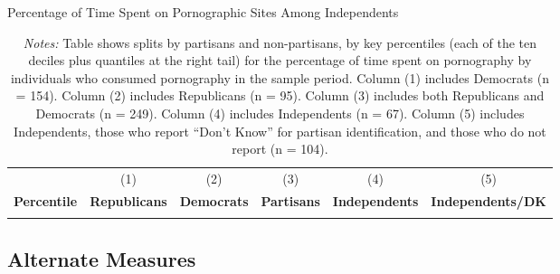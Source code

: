 \documentclass[12pt, letterpaper]{article}
\begin{document}
\begin{table}[ht] \centering \small \setlength\tabcolsep{6 pt}
	\caption{Percentage of Time Spent on Pornographic Sites Among Independents}
	\label{tab:percentiles_prop_duration_adultsites_by_individuals_independents_partisans}
	\begin{adjustbox}{max width=\textwidth}
		\begin{tabular}{@{\hspace{0\tabcolsep}}crrrrr@{\hspace{0\tabcolsep}}}
			\toprule		
			&\multicolumn{1}{c}{(1)}&\multicolumn{1}{c}{(2)}&\multicolumn{1}{c}{(3)}&\multicolumn{1}{c}{(4)}&\multicolumn{1}{c}{(5)}\\	
			\multicolumn{1}{l}{\textbf{Percentile}}&\multicolumn{1}{c}{\textbf{Republicans}}&\multicolumn{1}{c}{\textbf{Democrats}}&\multicolumn{1}{c}{\textbf{Partisans}}&\multicolumn{1}{c}{\textbf{Independents}}&\multicolumn{1}{r}{\textbf{Independents/DK}}\\
			\midrule
			\\
			\bottomrule
		\end{tabular}
	\end{adjustbox}
	\caption*{\footnotesize \emph{Notes:} 
		Table shows splits by partisans and non-partisans, by key percentiles (each of the ten deciles plus quantiles at the right tail) for the percentage of time spent on pornography by individuals who consumed pornography in the sample period. 
		Column (1) includes Democrats (n = 154).
		Column (2) includes Republicans (n = 95).
		Column (3) includes both Republicans and Democrats (n = 249).
		Column (4) includes Independents (n = 67).
		Column (5) includes Independents, those who report ``Don't Know'' for partisan identification, and those who do not report (n = 104).
	}
\end{table}

\FloatBarrier
\subsection{Alternate Measures}
\end{document}
